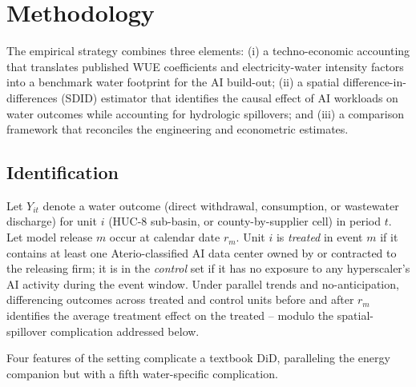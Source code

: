 \documentclass[11pt, letterpaper]{article}
\begin{document}
\section{Methodology}
\label{sec:methods}

The empirical strategy combines three elements: (i) a techno-economic accounting that translates published WUE coefficients and electricity-water intensity factors into a benchmark water footprint for the AI build-out; (ii) a spatial difference-in-differences (SDID) estimator that identifies the causal effect of AI workloads on water outcomes while accounting for hydrologic spillovers; and (iii) a comparison framework that reconciles the engineering and econometric estimates.

\subsection{Identification}
\label{sec:identification}

Let $Y_{it}$ denote a water outcome (direct withdrawal, consumption, or wastewater discharge) for unit $i$ (HUC-8 sub-basin, or county-by-supplier cell) in period $t$. Let model release $m$ occur at calendar date $r_m$. Unit $i$ is \emph{treated} in event $m$ if it contains at least one Aterio-classified AI data center owned by or contracted to the releasing firm; it is in the \emph{control} set if it has no exposure to any hyperscaler's AI activity during the event window. Under parallel trends and no-anticipation, differencing outcomes across treated and control units before and after $r_m$ identifies the average treatment effect on the treated -- modulo the spatial-spillover complication addressed below.

Four features of the setting complicate a textbook DiD, paralleling the energy companion but with a fifth water-specific complication.
\end{document}

